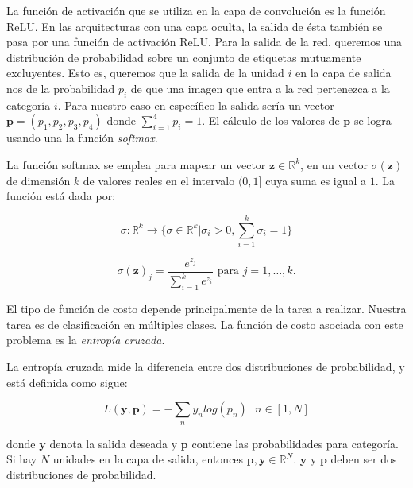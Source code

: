 La función de activación que se utiliza en la capa de
convolución es la función ReLU. En las arquitecturas con
una capa oculta, la salida de ésta también se pasa 
por una función de activación ReLU. Para la salida 
de la red, queremos una distribución de probabilidad
sobre un conjunto de etiquetas mutuamente excluyentes.
Esto es, queremos que la salida de la unidad $i$ en la capa
de salida nos de la probabilidad $p_i$ de que una imagen que
entra
a la red pertenezca a la categoría $i$. Para nuestro caso en específico
la salida sería un vector $\mathbf{p} = (p_1, p_2, p_3, p_4)$ donde $\sum_{i = 1}^4 p_i = 1$.
El cálculo de los valores de $\mathbf{p}$  se logra usando una la función \textit{softmax}.\\

\begin{remark}

La función softmax se emplea para mapear un vector $\mathbf{z} \in \mathbb{R}^k$,  en un vector $\sigma(\mathbf{z})$ de dimensión $k$ de valores reales en el intervalo $(0, 1]$ cuya suma es igual a $1$. La función está dada por: 
\end{remark}

\[
\sigma : \mathbb{R}^k \rightarrow \bigg \{ \sigma \in \mathbb{R}^k | \sigma_i > 0, \sum_{i=1}^k \sigma_i = 1 \bigg \}
\]

\[
\sigma(\mathbf{z})_j = \frac{e^{z_j}}{\sum_{i=1}^k e^{z_i}} \text{ para  } j=1,\dots,k.
\]
%

El tipo de función de costo depende principalmente de la tarea a realizar. Nuestra tarea es de clasificación en múltiples clases. La función
de costo asociada con este problema es la \textit{entropía cruzada}.\\

\begin{remark}
La entropía cruzada mide la diferencia entre dos distribuciones de probabilidad, y está
definida como sigue:

\[
L(\mathbf{y}, \mathbf{p}) = - \sum_{n} y_n log(p_n) \text{		} n \in [1,N]
\]

donde $\mathbf{y}$ denota la salida deseada y $\mathbf{p}$ contiene las probabilidades
para categoría. Si hay $N$ unidades en la capa de salida, entonces
$\mathbf{p}, \mathbf{y} \in \mathbb{R}^N$. $\mathbf{y}$ y $\mathbf{p}$ deben ser dos distribuciones de probabilidad.
\end{remark}


